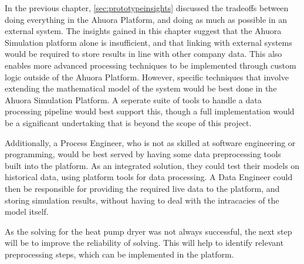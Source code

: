 In the previous chapter, \cref{sec:prototypeinsights} discussed the tradeoffs between doing everything in the Ahuora Platform, and doing as much as possible in an external system. The insights gained in this chapter suggest that the Ahuora Simulation platform alone is insufficient, and that linking with external systems would be required to store results in line with other company data. This also enables more advanced processing techniques to be implemented through custom logic outside of the Ahuora Platform. However, specific techniques that involve extending the mathematical model of the system would be best done in the Ahuora Simulation Platform. A seperate suite of tools to handle a data processing pipeline would best support this, though a full implementation would be a significant undertaking that is beyond the scope of this project. 

Additionally, a Process Engineer, who is not as skilled at software engineering or programming, would be best served by having some data preprocessing tools built into the platform. As an integrated solution, they could test their models on historical data, using platform tools for data processing. A Data Engineer could then be responsible for providing the required live data to the platform, and storing simulation results, without having to deal with the intracacies of the model itself.

As the solving for the heat pump dryer was not always successful, the next step will be to improve the reliability of solving. This will help to identify relevant preprocessing steps, which can be implemented in the platform.
